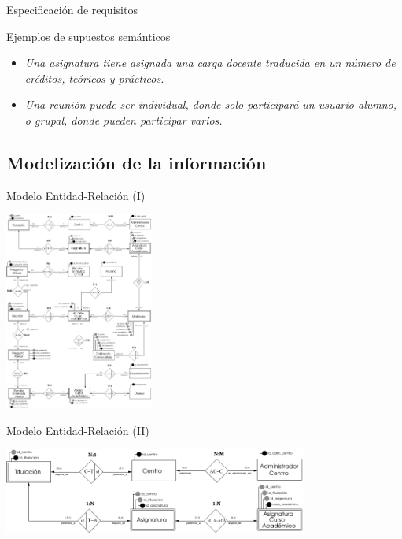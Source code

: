 \documentclass[10pt, hyperref={pdfpagelabels=false}]{beamer}
\begin{document}
      \begin{frame}{Especificación de requisitos}
        \begin{block}{Ejemplos de supuestos semánticos}
          \begin{itemize}
            \item \textit{Una asignatura tiene asignada una carga docente
                  traducida en un número de créditos, teóricos y prácticos.}
            \item \textit{Una reunión puede ser individual, donde solo
                  participará un usuario alumno, o grupal, donde pueden
                  participar varios.}
          \end{itemize}
        \end{block}
      \end{frame}


    \subsection{Modelización de la información}
      \begin{frame}{Modelo Entidad-Relación (I)}
        \begin{center}
          \includegraphics[height=6.5cm]{Diagramas/diagramaER}
        \end{center}
      \end{frame}

      \begin{frame}{Modelo Entidad-Relación (II)}
        \begin{center}
          \includegraphics[width=10cm]{Diagramas/diagramaER-1}
        \end{center}
      \end{frame}
\end{document}
